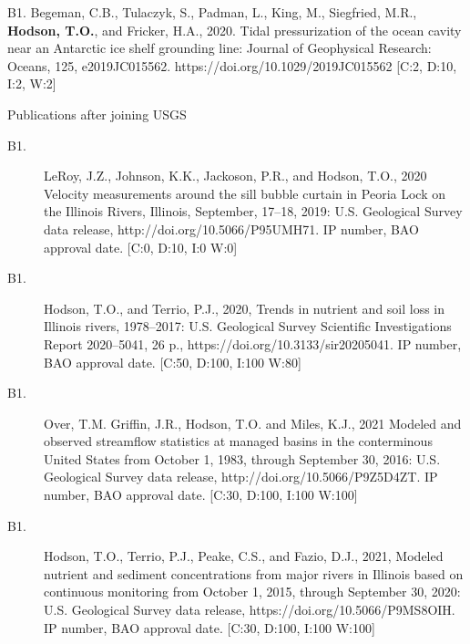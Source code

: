 \documentclass[12pt]{article}
\makeatletter
\def\namedlabel#1#2{\begingroup
	\def\@currentlabel{#2}%
	\label{#1}\endgroup
}
\makeatother
\begin{document}
	\item[B1.\namedlabel{wissardX}{B1}] 
    Begeman, C.B., Tulaczyk, S., Padman, L., King, M., Siegfried, M.R., \textbf{Hodson, T.O.}, and Fricker, H.A.,
    2020. Tidal pressurization of the ocean cavity near an Antarctic ice shelf grounding line:
    Journal of Geophysical Research: Oceans, 125, e2019JC015562. 
    https://doi.org/10.1029/2019JC015562
    [C:2, D:10, I:2, W:2]

\centering Publications after joining USGS \\
\vspace{-10pt}
\hrulefill
\raggedright
\vspace{10pt}


\begin{description}

	\item[B1.\namedlabel{peoria_dr}{B1}]
    LeRoy, J.Z., Johnson, K.K., Jackoson, P.R., and Hodson, T.O., 2020
    Velocity measurements around the sill bubble curtain in Peoria Lock on the Illinois Rivers, Illinois, September, 17--18, 2019:
    U.S. Geological Survey data release, http://doi.org/10.5066/P95UMH71.
    IP number, BAO approval date. [C:0, D:10, I:0 W:0]
    
	\item[B1.\namedlabel{trends}{B1}] 
    Hodson, T.O., and Terrio, P.J., 2020, 
    Trends in nutrient and soil loss in Illinois rivers, 1978–2017:
    U.S. Geological Survey Scientific Investigations Report 2020–5041, 26 p., https://doi.org/10.3133/sir20205041.
    IP number, BAO approval date. [C:50, D:100, I:100 W:80]
    
	\item[B1.\namedlabel{managed_dr}{B1}] 
    Over, T.M. Griffin, J.R., Hodson, T.O. and Miles, K.J., 2021
    Modeled and observed streamflow statistics at managed basins in the conterminous United States from October 1, 1983,
    through September 30, 2016:
    U.S. Geological Survey data release, http://doi.org/10.5066/P9Z5D4ZT.
    IP number, BAO approval date. [C:30, D:100, I:100 W:100]
    
	\item[B1.\namedlabel{supergages_dr}{B1}] 
    Hodson, T.O., Terrio, P.J., Peake, C.S., and Fazio, D.J.,
    2021, Modeled nutrient and sediment concentrations from major rivers in Illinois based on continuous monitoring from October 1, 2015, through September 30, 2020:
    U.S. Geological Survey data release, https://doi.org/10.5066/P9MS8OIH.
    IP number, BAO approval date. [C:30, D:100, I:100 W:100]
    

\end{description}
\end{document}
